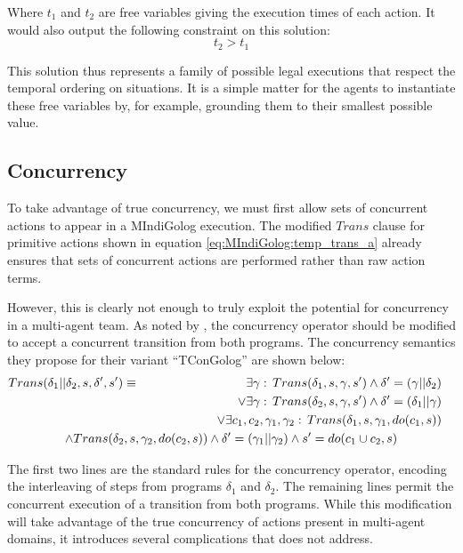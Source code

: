Where $t_{1}$ and $t_{2}$ are free variables giving the execution
times of each action. It would also output the following constraint
on this solution:\[
t_{2}>t_{1}\]


This solution thus represents a family of possible legal executions
that respect the temporal ordering on situations. It is a simple matter
for the agents to instantiate these free variables by, for example,
grounding them to their smallest possible value.


\subsection{Concurrency}

To take advantage of true concurrency, we must first allow sets of
concurrent actions to appear in a MIndiGolog execution. The modified
$Trans$ clause for primitive actions shown in equation \ref{eq:MIndiGolog:temp_trans_a}
already ensures that sets of concurrent actions are performed rather
than raw action terms.

However, this is clearly not enough to truly exploit the potential
for concurrency in a multi-agent team. As noted by \citet{pinto99tcongolog},
the concurrency operator should be modified to accept a concurrent
transition from both programs. The concurrency semantics they propose
for their variant {}``TConGolog'' are shown below:\begin{multline*}
Trans(\delta_{1}||\delta_{2},s,\delta',s')\equiv\,\,\,\,\,\,\,\,\,\,\,\,\,\,\,\,\,\,\,\,\,\,\,\,\,\,\,\,\,\,\,\,\,\,\,\,\,\,\,\,\,\:\,\,\,\,\,\,\,\,\,\shoveright{\exists\gamma:\, Trans(\delta_{1},s,\gamma,s')\wedge\delta'=(\gamma||\delta_{2})}\\
\shoveright{\vee\exists\gamma:\, Trans(\delta_{2},s,\gamma,s')\wedge\delta'=(\delta_{1}||\gamma)}\\
\shoveright{\vee\exists c_{1},c_{2},\gamma_{1},\gamma_{2}:\, Trans(\delta_{1},s,\gamma_{1},do(c_{1},s))}\\
\wedge Trans(\delta_{2},s,\gamma_{2},do(c_{2},s))\wedge\delta'=(\gamma_{1}||\gamma_{2})\wedge s'=do(c_{1}\cup c_{2},s)\end{multline*}


The first two lines are the standard rules for the concurrency operator,
encoding the interleaving of steps from programs $\delta_{1}$ and
$\delta_{2}$. The remaining lines permit the concurrent execution
of a transition from both programs. While this modification will take
advantage of the true concurrency of actions present in multi-agent
domains, it introduces several complications that \citep{pinto99tcongolog}
does not address.


